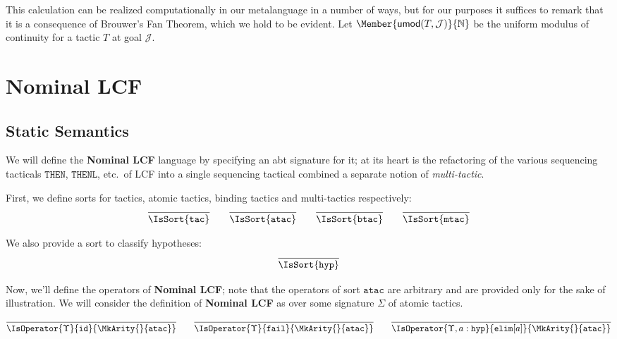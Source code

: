 This calculation can be realized computationally in our metalanguage in a
number of ways, but for our purposes it suffices to remark that it is a
consequence of Brouwer's Fan Theorem, which we hold to be evident. Let
$\Member{\UMod{T}{\mathcal{J}}}{\MLNat}$ be the uniform modulus of continuity
for a tactic $T$ at goal $\mathcal{J}$.

\section{Nominal LCF}

\subsection{Static Semantics}

\newcommand\SortATac{\mathtt{atac}}
\newcommand\SortBTac{\mathtt{btac}}
\newcommand\SortTac{\mathtt{tac}}
\newcommand\SortMTac{\mathtt{mtac}}
\newcommand\SortHyp{\mathtt{hyp}}

We will define the \textbf{Nominal LCF} language by specifying an abt signature
for it; at its heart is the refactoring of the various sequencing tacticals
$\mathtt{THEN}$, $\mathtt{THENL}$, etc.\ of LCF into a single sequencing
tactical combined a separate notion of \emph{multi-tactic}.

First, we define sorts for tactics, atomic tactics, binding tactics and multi-tactics
respectively:
\begin{gather*}
  \infer{
    \IsSort{\SortTac}
  }{}
  \qquad
  \infer{
    \IsSort{\SortATac}
  }{}
  \qquad
  \infer{
    \IsSort{\SortBTac}
  }{}
  \qquad
  \infer{
    \IsSort{\SortMTac}
  }{}
\end{gather*}

We also provide a sort to classify hypotheses:
\[
  \infer{
    \IsSort{\SortHyp}
  }{
  }
\]

Now, we'll define the operators of \textbf{Nominal LCF}; note that the
operators of sort $\SortATac$ are arbitrary and are provided only for the sake
of illustration. We will consider the definition of \textbf{Nominal LCF} as
over some signature $\Sigma$ of atomic tactics.

\[
  \infer{
    \IsOperator{\Upsilon}{\mathtt{id}}{
      \MkArity{}{\SortATac}
    }
  }{
  }
  \qquad
  \infer{
    \IsOperator{\Upsilon}{\mathtt{fail}}{
      \MkArity{}{\SortATac}
    }
  }{
  }
  \qquad
  \infer{
    \IsOperator{\Upsilon,a:\SortHyp}{\mathtt{elim}[a]}{
      \MkArity{}{\SortATac}
    }
  }{
  }
\]


